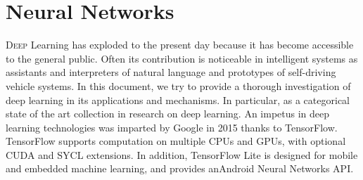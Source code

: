 \chapter{Neural Networks}
\label{chap:neuralnetworks}
%
\lettrine[lines=3]{D}{eep} Learning has exploded to the present day because it 
has become accessible to the general public. Often its contribution is 
noticeable in intelligent systems as assistants and interpreters of natural 
language and prototypes of self-driving vehicle systems. In this document, we 
try to provide a thorough investigation of deep learning in its applications and 
mechanisms. In particular, as a categorical state of the art collection in 
research on deep learning. An impetus in deep learning technologies was imparted 
by Google in 2015 thanks to TensorFlow. TensorFlow supports computation on 
multiple CPUs and GPUs, with optional CUDA and SYCL extensions. In addition, 
TensorFlow Lite is designed for mobile and embedded machine learning, and 
provides anAndroid Neural Networks API.\cite{article}
% 
% 




